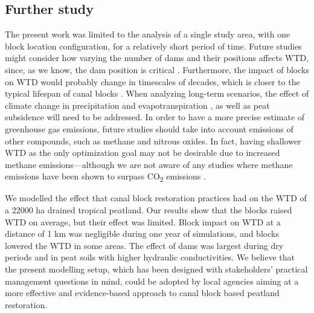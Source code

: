 \documentclass[bg, manuscript]{copernicus}
\begin{document}
\subsection{Further study}
The present work was limited to the analysis of a single study area, with one block location configuration, for a relatively short period of time.
Future studies might consider how varying the number of dams and their positions affects WTD, since, as we know,  the dam position is critical \citep{urzainkiCanalBlockingOptimization2020}.
Furthermore, the impact of blocks on WTD would probably change in timescales of decades, which is closer to the typical lifespan of canal blocks \citep{ritzemaCanalBlockingStrategies2014, dohongReviewTechniquesEffective2018}.
When analyzing long-term scenarios, the effect of climate change in precipitation and evapotranspiration \citep{gallego-salaLatitudinalLimitsPredicted2018, wangPotentialShiftCarbon2018, caiIncreasingFrequencyExtreme2014, portnerClimateChange20222022}, as well as peat subsidence \citep{evansRatesSpatialVariability2019, hoytWidespreadSubsidenceCarbon2020, evansLongtermTrajectoryTemporal2022} will need to be addressed.
In order to have a more precise estimate of greenhouse gas emissions, future studies should take into account emissions of other compounds, such as methane and nitrous oxides.
In fact, having shallower WTD as the only optimization goal may not be desirable due to increased methane emissions---although we are not aware of any studies where methane emissions have been shown to surpass CO\textsubscript{2} emissions \citep{tehSeasonalVariabilityMethane2017, wongMicrometeorologicalMeasurementMethane2018, planas-clarkeEffectWaterTable2020, deshmukhImpactForestPlantation2020, deshmukhConservationSlowsEmission2021, kiuruPeatMacroporeNetworks2022, zouRewettingGlobalWetlands2022, lestariRewettingTropicalPeatlands2022}.

\conclusions  %
We modelled the effect that canal block restoration practices had on the WTD of a 22000 \unit{ha} drained tropical peatland.
Our results show that the blocks raised WTD on average, but their effect was limited.
Block impact on WTD at a distance of 1 \unit{km} was negligible during one year of simulations, and blocks lowered the WTD in some  areas.
The effect of dams was largest during dry periods and in peat soils with higher hydraulic conductivities.
We believe that the present modelling setup, which has been designed with stakeholders' practical management questions in mind, could be adopted by local agencies aiming at a more effective and evidence-based approach to canal block based peatland restoration.
\end{document}
